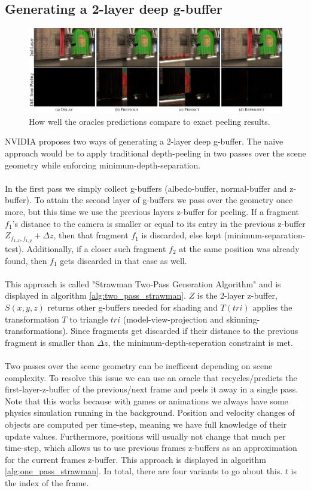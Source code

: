 \documentclass{ACGSeminar}
\begin{document}
	\subsection{Generating a 2-layer deep g-buffer}
		\begin{figure}[htb!]
			\includegraphics[width=\textwidth]{img/generating2.png}%
			\caption{How well the oracles predictions compare to exact peeling results.}
			\label{fig:generating}%
		\end{figure}
		NVIDIA proposes two ways of generating a 2-layer deep g-buffer. The naive approach would be to apply traditional depth-peeling in two passes over the scene geometry while enforcing minimum-depth-separation. \\\\
		In the first pass we simply collect g-buffers (albedo-buffer, normal-buffer and z-buffer). To attain the second layer of g-buffers we pass over the geometry once more, but this time we use the previous layers z-buffer for peeling. If a fragment $f_1$'s distance to the camera is smaller or equal to its entry in the previous z-buffer $Z_{f_{1,x},f_{1,y}} + \Delta z$, then that fragment $f_1$ is discarded, else kept (minimum-separation-test). Additionally, if a closer such fragment $f_2$ at the same position was already found, then $f_1$ gets discarded in that case as well. \\\\
		This approach is called "Strawman Two-Pass Generation Algorithm" and is displayed in algorithm \ref{alg:two_pass_strawman}. $Z$ is the 2-layer z-buffer, $S(x, y, z)$ returns other g-buffers needed for shading and $T(tri)$ applies the transformation $T$ to triangle $tri$ (model-view-projection and skinning-transformations). Since fragments get discarded if their distance to the previous fragment is smaller than $\Delta z$, the minimum-depth-seperation constraint is met. \\\\
		Two passes over the scene geometry can be inefficent depending on scene complexity. To resolve this issue we can use an oracle that recycles/predicts the first-layer-z-buffer of the previous/next frame and peels it away in a single pass. Note that this works because with games or animations we always have some physics simulation running in the background. Position and velocity changes of objects are computed per time-step, meaning we have full knowledge of their update values. Furthermore, positions will usually not change that much per time-step, which allows us to use previous frames z-buffers as an approximation for the current frames z-buffer. This approach is displayed in algorithm \ref{alg:one_pass_strawman}. In total, there are four variants to go about this. $t$ is the index of the frame.%
\end{document}
